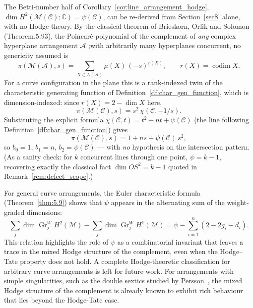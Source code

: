 \documentclass[article,11pt]{amsart} \numberwithin{equation}{section}
\numberwithin{equation}{section}
\begin{document}
{\begin{rk}
	\label{rem:poincare-crosscheck}
	The Betti-number half of Corollary~\ref{cor:line_arrangement_hodge},
	$\dim H^2(\mathcal M(\mathcal C);\mathbb{C})=\psi(\mathcal C)$, can be re-derived from
	Section~\ref{sec8} alone, with no Hodge theory. By the classical theorem of Brieskorn,
	Orlik and Solomon (\cite{OrlikTerao}Theorem.5.93), the Poincar\'e polynomial of the complement of \emph{any} complex
	hyperplane arrangement $\mathcal A$ ;with arbitrarily many hyperplanes
	concurrent, no genericity assumed is
	\[
	\pi(\mathcal M(\mathcal A),s)=\sum_{X\in L(\mathcal A)}\mu(X)\,(-s)^{r(X)},\qquad
	r(X)=\operatorname{codim}X .
	\]
	For a curve configuration in the plane this is a rank-indexed twin of the
	characteristic generating function of Definition~\ref{df:char_gen_function}, which is
	dimension-indexed: since $r(X)=2-\dim X$ here,
	\[
	\pi(\mathcal M(\mathcal C),s)=s^2\,\chi(\mathcal C,-1/s).
	\]
	Substituting the explicit formula $\chi(\mathcal C,t)=t^2-nt+\psi(\mathcal C)$
	(the line following Definition~\ref{df:char_gen_function}) gives
	\[
	\pi(\mathcal M(\mathcal C),s)=1+ns+\psi(\mathcal C)\,s^2 ,
	\]
	so $b_0=1$, $b_1=n$, $b_2=\psi(\mathcal C)$ --- with \emph{no} hypothesis on
	the intersection pattern. (As a sanity check: for $k$ concurrent lines through
	one point, $\psi=k-1$, recovering exactly the classical fact
	$\dim OS^2=k-1$ quoted in Remark~\ref{rem:defect_scope}.)
\end{rk}

\begin{rk}
	\label{rmk:hodge_euler_alternating}
	For general curve arrangements, the Euler characteristic formula (Theorem~\ref{thm:5.9}) shows that $\psi$ appears in the alternating sum of the weight-graded dimensions:
	\[
	\sum_j \dim \operatorname{Gr}_j^W H^2(\mathcal M) - \sum_j \dim \operatorname{Gr}_j^W H^1(\mathcal M)
	= \psi - \sum_{i=1}^n (2-2g_i-d_i).
	\]
	This relation highlights the role of $\psi$ as a combinatorial invariant that leaves a trace in the mixed Hodge structure of the complement, even when the Hodge--Tate property does not hold. A complete Hodge-theoretic classification for arbitrary curve arrangements is left for future work. For arrangements with simple singularities, such as the double sextics studied by Persson~\cite{Persson1985}, the mixed Hodge structure of the complement is already known to exhibit rich behaviour that lies beyond the Hodge-Tate case.
\end{rk}

}
\end{document}

